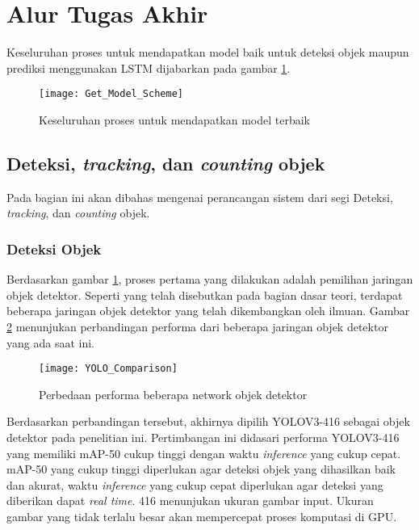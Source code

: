 \documentclass[../thesis.tex]{subfiles}
\begin{document}
\section{Alur Tugas Akhir}
Keseluruhan proses untuk mendapatkan model baik untuk deteksi objek maupun prediksi menggunakan LSTM dijabarkan pada gambar \ref{get_model_scheme}.
\begin{figure}[htp]
	\centering
	\texttt{[image: Get\_Model\_Scheme]}
	\caption{Keseluruhan proses untuk mendapatkan model terbaik}
	\label{get_model_scheme}
\end{figure}

\subsection{Deteksi, \textit{tracking}, dan \textit{counting} objek}
Pada bagian ini akan dibahas mengenai perancangan sistem dari segi Deteksi, \textit{tracking}, dan \textit{counting} objek.
\subsubsection{Deteksi Objek}
Berdasarkan gambar \ref{get_model_scheme}, proses pertama yang dilakukan adalah pemilihan jaringan objek detektor. Seperti yang telah disebutkan pada bagian dasar teori, terdapat beberapa jaringan objek detektor yang telah dikembangkan oleh ilmuan. 
Gambar \ref{yolo_comparison} menunjukan perbandingan performa dari beberapa jaringan objek detektor yang ada saat ini.
\begin{figure}
	\centering
	\texttt{[image: YOLO\_Comparison]}
	\caption{Perbedaan performa beberapa network objek detektor}
	\label{yolo_comparison}
\end{figure}

Berdasarkan perbandingan tersebut, akhirnya dipilih YOLOV3-416 sebagai objek detektor pada penelitian ini. Pertimbangan ini didasari performa YOLOV3-416 yang memiliki mAP-50 cukup tinggi dengan waktu \textit{inference} yang cukup cepat. 
mAP-50 yang cukup tinggi diperlukan agar deteksi objek yang dihasilkan baik dan akurat, waktu \textit{inference} yang cukup cepat diperlukan agar deteksi yang diberikan dapat \textit{real time}. 416 menunjukan ukuran gambar input. Ukuran gambar yang tidak terlalu besar akan mempercepat proses komputasi di GPU.
\end{document}
